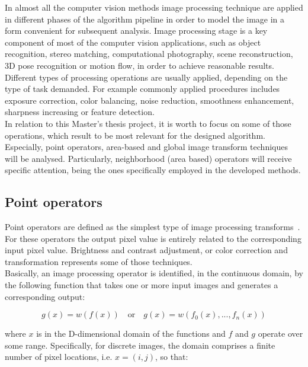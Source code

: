 In almost all the computer vision methods image processing technique are applied in different phases of the algorithm pipeline in order to model the image in a form convenient for subsequent analysis. 
Image processing stage is a key component of most of the computer vision applications, such as object recognition, stereo matching, computational photography, scene reconstruction, 3D pose recognition or motion flow, in order to achieve reasonable results. 
Different types of processing operations are usually applied, depending on the type of task demanded.
For example commonly applied procedures includes exposure correction, color balancing, noise reduction, smoothness enhancement, sharpness increasing or feature detection.\\
In relation to this Master's thesis project, it is worth to focus on some of those operations, which result to be most relevant for the designed algorithm. 
Especially, point operators, area-based and global image transform techniques will be analysed. 
Particularly, neighborhood (area based) operators will receive specific attention, being the ones specifically employed in the developed methods. \\

\subsection{Point operators}
\label{subsection:point-operators}

Point operators are defined as the simplest type of image processing transforms~\cite{Szeliski2011}.
For these operators the output pixel value is entirely related to the corresponding input pixel value.
Brightness and contrast adjustment, or color correction and transformation represents some of those techniques.\\
Basically, an image processing operator is identified, in the continuous domain, by the following function that takes one or more input images and generates a corresponding output:

\begin{equation}
 \label{eqn:img-operator}
 g(x) = w(f(x)) \quad 	\mbox{or} \quad g(x) = w(f_0(x), ..., f_n(x))
\end{equation}

where $x$ is in the D-dimensional domain of the functions and $f$ and $g$ operate over some range.
Specifically, for discrete images, the domain comprises a finite number of pixel locations, i.e. $x = (i, j)$, so that:


